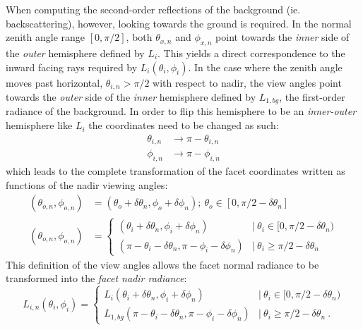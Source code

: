 \documentclass{article}
\numberwithin{equation}{section}
\begin{document}
        When computing the second-order reflections of the background (ie. backscattering), however, looking
        towards the ground is required.
        In the normal zenith angle range $[0, \pi/2]$, both $\theta_{x, n}$ and $\phi_{x, n}$ point towards the
        \textit{inner} side of the \textit{outer} hemisphere defined by $L_i$.
        This yields a direct correspondence to the inward facing rays required by $L_i (\theta_i, \phi_i)$.
        In the case where the zenith angle moves past horizontal, $\theta_{i, n} > \pi / 2$ with respect to nadir,
         the view angles point towards the \textit{outer} side of the \textit{inner} hemisphere defined by
         $L_{1, bg}$, the first-order radiance of the background.
        In order to flip this hemisphere to be an \textit{inner-outer} hemisphere like $L_i$ the coordinates need
        to be changed as such:
        \begin{align*}
            \theta_{i, n} &\longrightarrow \pi - \theta_{i, n} \\
            \phi_{i, n} &\longrightarrow \pi - \phi_{i, n}
        \end{align*}
        which leads to the complete transformation of the facet coordinates written as functions of the nadir
        viewing angles:
        \begin{align} \label{nadircoords}
            (\theta_{o, n}, \phi_{o, n}) &= 
                (\theta_o + \delta\theta_n, \phi_o + \delta\phi_n) ;\ \theta_o \in [0, \pi/2 - \delta\theta_n]
                \nonumber \\
            (\theta_{o, n}, \phi_{o, n}) &= {
                \begin{cases}
                    (\theta_i + \delta\theta_n, \phi_i + \delta\phi_n) 
                        &\mid\ \theta_i \in [0, \pi/2 - \delta\theta_n) \\
                    (\pi - \theta_i - \delta\theta_n, \pi - \phi_i - \delta\phi_n) 
                        &\mid\ \theta_i \geq \pi/2 - \delta\theta_n
                \end{cases}
            }
        \end{align}
        This definition of the view angles allows the facet normal radiance to be transformed into the 
        \textit{facet nadir radiance}:
        \begin{equation} \label{nadirrad}
            L_{i, n}(\theta_{i}, \phi_{i}) = 
                \begin{cases}
                    L_i(\theta_i + \delta\theta_n, \phi_i + \delta\phi_n)
                        &\mid\ \theta_i \in [0, \pi/2 - \delta\theta_n) \\
                    L_{1, bg}(\pi - \theta_i - \delta\theta_n, \pi - \phi_i - \delta\phi_n)
                        &\mid\ \theta_i \geq \pi/2 - \delta\theta_n \ .
                \end{cases}
        \end{equation}
\end{document}
